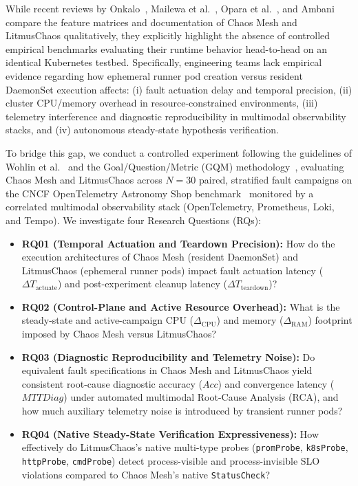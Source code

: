 While recent reviews by Onkalo~\cite{onkalo2025improving}, Mailewa et al.~\cite{mailewa2025review}, Opara et al.~\cite{opara2025chaos}, and Ambani~\cite{ambani2025systematic} compare the feature matrices and documentation of Chaos Mesh and LitmusChaos qualitatively, they explicitly highlight the absence of controlled empirical benchmarks evaluating their runtime behavior head-to-head on an identical Kubernetes testbed. Specifically, engineering teams lack empirical evidence regarding how ephemeral runner pod creation versus resident DaemonSet execution affects: (i) fault actuation delay and temporal precision, (ii) cluster CPU/memory overhead in resource-constrained environments, (iii) telemetry interference and diagnostic reproducibility in multimodal observability stacks, and (iv) autonomous steady-state hypothesis verification.

To bridge this gap, we conduct a controlled experiment following the guidelines of Wohlin et al.~\cite{wohlin_2012} and the Goal/Question/Metric (GQM) methodology~\cite{basili_1994}, evaluating Chaos Mesh and LitmusChaos across $N=30$ paired, stratified fault campaigns on the CNCF OpenTelemetry Astronomy Shop benchmark~\cite{opentelemetry_demo, wang2024building} monitored by a correlated multimodal observability stack (OpenTelemetry, Prometheus, Loki, and Tempo). We investigate four Research Questions (RQs):
\begin{itemize}[leftmargin=1.2em, itemsep=2pt, topsep=3pt]
    \item \textbf{RQ01 (Temporal Actuation and Teardown Precision):} How do the execution architectures of Chaos Mesh (resident DaemonSet) and LitmusChaos (ephemeral runner pods) impact fault actuation latency ($\Delta T_{\text{actuate}}$) and post-experiment cleanup latency ($\Delta T_{\text{teardown}}$)?
    \item \textbf{RQ02 (Control-Plane and Active Resource Overhead):} What is the steady-state and active-campaign CPU ($\Delta_{\text{CPU}}$) and memory ($\Delta_{\text{RAM}}$) footprint imposed by Chaos Mesh versus LitmusChaos?
    \item \textbf{RQ03 (Diagnostic Reproducibility and Telemetry Noise):} Do equivalent fault specifications in Chaos Mesh and LitmusChaos yield consistent root-cause diagnostic accuracy ($Acc$) and convergence latency ($MTTDiag$) under automated multimodal Root-Cause Analysis (RCA), and how much auxiliary telemetry noise is introduced by transient runner pods?
    \item \textbf{RQ04 (Native Steady-State Verification Expressiveness):} How effectively do LitmusChaos's native multi-type probes (\texttt{promProbe}, \texttt{k8sProbe}, \texttt{httpProbe}, \texttt{cmdProbe}) detect process-visible and process-invisible SLO violations compared to Chaos Mesh's native \texttt{StatusCheck}?
\end{itemize}
